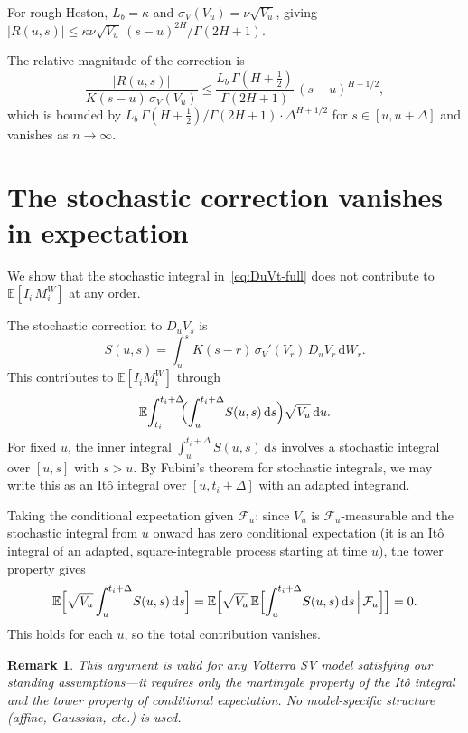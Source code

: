 \documentclass[12pt]{article}
\newtheorem{remark}{Remark}
\theoremstyle{definition}
\newcommand{\E}{\mathbb{E}}
\newcommand{\dd}{\mathrm{d}}
\begin{document}
For rough Heston, $L_b = \kappa$ and
$\sigma_V(V_u) = \nu\sqrt{V_u}$, giving
$|R(u,s)| \le \kappa\nu\sqrt{V_u}\,(s{-}u)^{2H}/\Gamma(2H{+}1)$.

The relative magnitude of the correction is
\[
  \frac{|R(u,s)|}{K(s{-}u)\,\sigma_V(V_u)}
  \le \frac{L_b\,\Gamma(H{+}\tfrac12)}{\Gamma(2H{+}1)}\,
    (s{-}u)^{H+1/2},
\]
which is bounded by
$L_b\,\Gamma(H{+}\tfrac12)/\Gamma(2H{+}1)\cdot\Delta^{H+1/2}$
for $s \in [u, u{+}\Delta]$ and vanishes as $n \to \infty$.

\section{The stochastic correction vanishes in expectation}
\label{app:stoch-correction}

We show that the stochastic integral in~\eqref{eq:DuVt-full} does not
contribute to $\E[I_i\,M_i^W]$ at any order.

The stochastic correction to $D_u V_s$ is
\[
  S(u,s) = \int_u^s\! K(s{-}r)\,\sigma_V'(V_r)\,D_u V_r\,\dd W_r.
\]
This contributes to $\E[I_i M_i^W]$ through
\begin{align*}
  \E\!\int_{t_i}^{t_i+\Delta}\!\!
  \Bigl(\int_u^{t_i+\Delta}\! S(u,s)\,\dd s\Bigr)
  \sqrt{V_u}\,\dd u.
\end{align*}
For fixed $u$, the inner integral
$\int_u^{t_i+\Delta}\! S(u,s)\,\dd s$ involves a stochastic integral
over $[u, s]$ with $s > u$.
By Fubini's theorem for stochastic integrals, we may write this as
an It\^o integral over $[u, t_i{+}\Delta]$ with an adapted integrand.

Taking the conditional expectation given $\mathcal{F}_u$: since $V_u$
is $\mathcal{F}_u$-measurable and the stochastic integral from $u$
onward has zero conditional expectation (it is an It\^o integral of
an adapted, square-integrable process starting at time $u$),
the tower property gives
\[
  \E\Bigl[\sqrt{V_u}\int_u^{t_i+\Delta}\! S(u,s)\,\dd s\Bigr]
  = \E\Bigl[\sqrt{V_u}\,
  \E\Bigl[\int_u^{t_i+\Delta}\! S(u,s)\,\dd s
  \,\Big|\,\mathcal{F}_u\Bigr]\Bigr]
  = 0.
\]
This holds for each $u$, so the total contribution vanishes.

\begin{remark}
This argument is valid for \emph{any} Volterra SV model satisfying
our standing assumptions---it requires only the martingale property
of the It\^o integral and the tower property of conditional
expectation. No model-specific structure (affine, Gaussian, etc.)
is used.
\end{remark}
\end{document}
